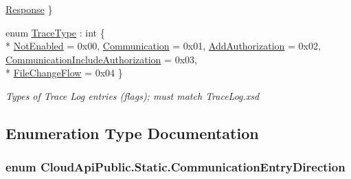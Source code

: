 \begin{DoxyCompactItemize}
\hyperlink{namespace_cloud_api_public_1_1_static_a5c3e1c9c171c6fc2d14d98e753f33c72}{Response}
 \}
\begin{DoxyCompactList}\small\item\em \end{DoxyCompactList}\item 
enum \hyperlink{namespace_cloud_api_public_1_1_static_a7e5ae8f2a85f427de3d6c8a5afcbb029}{Trace\-Type} \-: int \{ \\*
\hyperlink{namespace_cloud_api_public_1_1_static_a7e5ae8f2a85f427de3d6c8a5afcbb029}{Not\-Enabled} = 0x00, 
\hyperlink{namespace_cloud_api_public_1_1_static_a7e5ae8f2a85f427de3d6c8a5afcbb029}{Communication} = 0x01, 
\hyperlink{namespace_cloud_api_public_1_1_static_a7e5ae8f2a85f427de3d6c8a5afcbb029}{Add\-Authorization} = 0x02, 
\hyperlink{namespace_cloud_api_public_1_1_static_a7e5ae8f2a85f427de3d6c8a5afcbb029}{Communication\-Include\-Authorization} = 0x03, 
\\*
\hyperlink{namespace_cloud_api_public_1_1_static_a7e5ae8f2a85f427de3d6c8a5afcbb029}{File\-Change\-Flow} = 0x04
 \}
\begin{DoxyCompactList}\small\item\em Types of Trace Log entries (flags); must match Trace\-Log.\-xsd \end{DoxyCompactList}\end{DoxyCompactItemize}


\subsection{Enumeration Type Documentation}
\hypertarget{namespace_cloud_api_public_1_1_static_a5c3e1c9c171c6fc2d14d98e753f33c72}{
\subsubsection[{Communication\-Entry\-Direction}]{\setlength{\rightskip}{0pt plus 5cm}enum {\bf Cloud\-Api\-Public.\-Static.\-Communication\-Entry\-Direction}}}\label{namespace_cloud_api_public_1_1_static_a5c3e1c9c171c6fc2d14d98e753f33c72}




